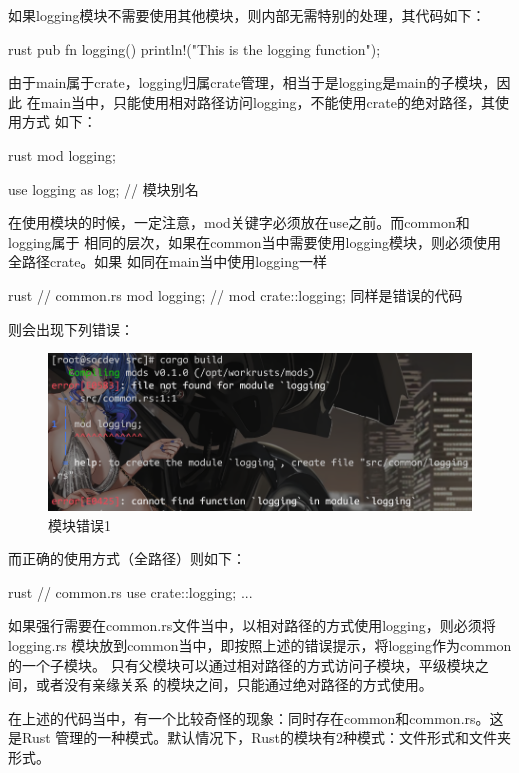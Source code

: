 如果logging模块不需要使用其他模块，则内部无需特别的处理，其代码如下：
\begin{code-block}{rust}
pub fn logging() {
    println!("This is the logging function");
}
\end{code-block}
由于main属于crate，logging归属crate管理，相当于是logging是main的子模块，因此
在main当中，只能使用相对路径访问logging，不能使用crate的绝对路径，其使用方式
如下：
\begin{code-block}{rust}
mod logging;

use logging as log; // 模块别名
\end{code-block}
在使用模块的时候，一定注意，mod关键字必须放在use之前。而common和logging属于
相同的层次，如果在common当中需要使用logging模块，则必须使用全路径crate。如果
如同在main当中使用logging一样
\begin{code-block}{rust}
// common.rs
mod logging;
// mod crate::logging; 同样是错误的代码
\end{code-block}
则会出现下列错误：
\begin{figure}[H]
  \centering
  \includegraphics[scale=0.4]{rust_mod_error1.png}
  \caption{模块错误1}
  \label{fig:rust_mod_error1}
\end{figure}
而正确的使用方式（全路径）则如下：
\begin{code-block}{rust}
// common.rs
use crate::logging;
...
\end{code-block}

如果强行需要在common.rs文件当中，以相对路径的方式使用logging，则必须将logging.rs
模块放到common当中，即按照上述的错误提示，将logging作为common的一个子模块。
只有父模块可以通过相对路径的方式访问子模块，平级模块之间，或者没有亲缘关系
的模块之间，只能通过绝对路径的方式使用。

在上述的代码当中，有一个比较奇怪的现象：同时存在common和common.rs。这是Rust
管理的一种模式。默认情况下，Rust的模块有2种模式：文件形式和文件夹形式。

